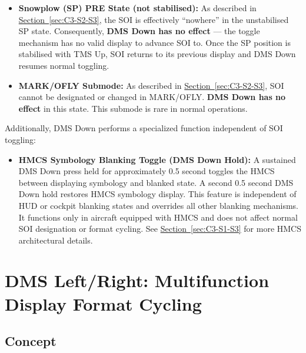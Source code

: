 \documentclass[11pt, a4paper, twoside]{report}
\newcommand{\secref}[1]{\hyperref[#1]{Section~\ref*{#1}}}
\begin{document}
\begin{itemize}
	\item \textbf{Snowplow (SP) PRE State (not stabilised):} As described in \secref{sec:C3-S2-S3}, the SOI is effectively ``nowhere'' in the unstabilised SP state. Consequently, \textbf{DMS Down has no effect} — the toggle mechanism has no valid display to advance SOI to. Once the SP position is stabilised with TMS Up, SOI returns to its previous display and DMS Down resumes normal toggling.
	\item \textbf{MARK/OFLY Submode:} As described in \secref{sec:C3-S2-S3}, SOI cannot be designated or changed in MARK/OFLY. \textbf{DMS Down has no effect} in this state. This submode is rare in normal operations.
\end{itemize}

Additionally, DMS Down performs a specialized function independent of SOI toggling:

\begin{itemize}
	\item \textbf{HMCS Symbology Blanking Toggle (DMS Down Hold):} 
	A sustained DMS Down press held for approximately 0.5 second toggles the HMCS between displaying symbology and blanked state. A second 0.5 second DMS Down hold restores HMCS symbology display. This feature is independent of HUD or cockpit blanking states and overrides all other blanking mechanisms. It functions only in aircraft equipped with HMCS and does not affect normal SOI designation or format cycling. See \secref{sec:C3-S1-S3} for more HMCS architectural details.
\end{itemize}

\section{DMS Left/Right: Multifunction Display Format Cycling}
\label{sec:C3-S4}


\subsection{Concept}
\label{sec:C3-S4-S1}
\end{document}
